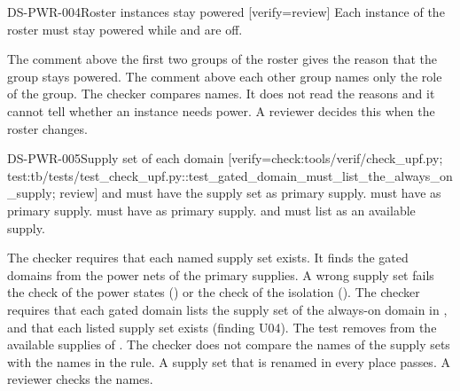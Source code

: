 \begin{requirement}{DS-PWR-004}{Roster instances stay powered}
[verify={review}]
Each instance of the roster must stay powered while  and  are off.
\end{requirement}
\begin{information}
The comment above the first two groups of the roster gives the reason that the group stays powered. The comment above each other group names only the role of the group. The checker compares names. It does not read the reasons and it cannot tell whether an instance needs power. A reviewer decides this when the roster changes.
\end{information}

\begin{requirement}{DS-PWR-005}{Supply set of each domain}
[verify={check:tools/verif/check_upf.py; test:tb/tests/test_check_upf.py::test_gated_domain_must_list_the_always_on_supply; review}]
 and  must have the supply set  as primary supply.  must have  as primary supply.  must have  as primary supply.  and  must list  as an available supply.
\end{requirement}
\begin{information}
The checker requires that each named supply set exists. It finds the gated domains from the power nets of the primary supplies. A wrong supply set fails the check of the power states () or the check of the isolation (). The checker requires that each gated domain lists the supply set of the always-on domain in , and that each listed supply set exists (finding U04). The test removes  from the available supplies of . The checker does not compare the names of the supply sets with the names in the rule. A supply set that is renamed in every place passes. A reviewer checks the names.
\end{information}

